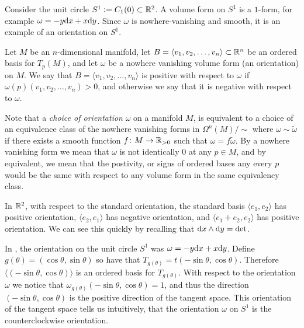 \documentclass[11pt,a4paper]{article}
\begin{document}
\begin{example}
  \label{exmp:orientation-of-S-one}
  Consider the unit circle $S^1 := C_1(0) \subset \mathbb{R}^2$.
  A volume form on $S^1$ is a $1$-form,
  for example $\omega = -y \dx + x \dy$.
  Since $\omega$ is nowhere-vanishing and smooth,
  it is an example of an orientation on $S^1$.
\end{example}

\begin{definition}
  \label{def:std-orientation-of-a-basis}
  Let $M$ be an $n$-dimensional manifold,
  let $B = \langle v_1,v_2,\dots,v_n\rangle \subset \mathbb{R}^n$ be an ordered basis
  for $T_p(M)$,
  and let $\omega$ be a nowhere vanishing volume form (an orientation) on $M$.
  We say that $B = \langle v_1,v_2,\dots,v_n\rangle$ is positive with respect
  to $\omega$ if $\omega(p)(v_1,v_2,\dots,v_n) > 0$,
  and otherwise we say that it is negative with respect to $\omega$.
\end{definition}

\begin{remark}
  Note that a \textit{choice of orientation} $\omega$ on a manifold $M$,
  is equivalent to a choice of an equivalence class of
  the nowhere vanishing forms in $\Omega^n(M) / \sim$
  where $\omega \sim \tilde \omega$ if there exists
  a smooth function $f \colon M \to \mathbb{R}_{>0}$
  such that $\omega = f \tilde \omega$.
  By a nowhere vanishing form
  we mean that $\omega$ is not identically $0$ at any $p \in M$,
  and by equivalent, we mean that the postivity, or signs
  of ordered bases any every $p$ would be the same with respect to
  any volume form in the same equivalency class.
\end{remark}

\begin{example}
  In $\mathbb{R}^2$, with respect to the standard orientation,
  the standard basis $\langle e_1,e_2 \rangle$ has positive
  orientation, $\langle e_2,e_1 \rangle$ has negative orientation,
  and $\langle e_1 + e_2,e_2 \rangle$ has positive orientation.
  We can see this quickly by recalling that $\dx \wedge \dy = \det$.
\end{example}

\begin{remark}
  In ,
  the orientation on the unit circle $S^1$ was $\omega = -y \dx + x \dy$.
  Define $g(\theta) = (\cos\theta,\sin\theta)$
  so have that $T_{g(\theta)} = t(-\sin\theta,\cos\theta)$.
  Therefore $\langle (-\sin\theta,\cos\theta) \rangle$ is an ordered
  basis for $T_{g(\theta)}$.
  With respect to the orientation $\omega$ we notice that
  $\omega_{g(\theta)}(-\sin\theta,\cos\theta) = 1$,
  and thus the direction $(-\sin\theta,\cos\theta)$ is the positive
  direction of the tangent space.
  This orientation of the tangent space tells us intuitively,
  that the orientation $\omega$ on $S^1$ is the counterclockwise orientation.
\end{remark}
\end{document}
